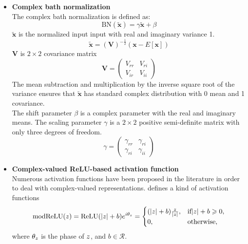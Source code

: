 \documentclass[11pt]{report}
\begin{document}
    \begin{itemize}
    	\item \textbf{Complex bath normalization}\\
    	 The complex bath normalization is defined as:
    	 \begin{equation}
    	 \text{BN}\left(\widetilde{\mathbf{x}}\right) = \gamma \widetilde{\mathbf{x}} + \beta
    	 \end{equation}
    	 $\widetilde{\mathbf{x}}$ is the normalized input input with real and imaginary variance 1. 
    	 \begin{equation}
    	 \widetilde{\mathbf{x}} = \left(\mathbf{V}\right)^{-\frac{1}{2}}\left(\mathbf{x}-E[\mathbf{x}]\right)
    	 \end{equation}
    	 $\mathbf{V}$ is $2 \times 2$ covariance matrix\\
    	 \begin{equation}
    	 \mathbf{V} = \begin{pmatrix}
    	 V_{rr} &V_{ri} \\
    	 V_{ir} &V_{ii}
    	 \end{pmatrix}
    	 \end{equation}
    	 The mean subtraction and multiplication by the inverse square root of the variance ensures that $\widetilde{\mathbf{x}}$ has standard complex distribution with 0 mean and 1 covariance.\\
    	 The shift parameter $\beta$ is a complex parameter with the real and imaginary means. The scaling parameter $\gamma$ is a $2 \times 2$ positive semi-definite matrix with only three degrees of freedom.
    	 \begin{equation}
    	 \gamma = \begin{pmatrix}
    	 \gamma _{rr} &\gamma _{ri} \\
    	 \gamma _{ri} &\gamma _{ii}
    	 \end{pmatrix}
    	 \end{equation}
    	 
    \end{itemize}
    
    \begin{itemize}
    	\item \textbf{Complex-valued ReLU-based activation function}\\
    	Numerous activation functions have been proposed in the literature in order to deal with complex-valued representations. \cite{DBLP:journals/corr/ArjovskySB15} defines a kind of activation functions
    	\begin{equation}
    	\text{modReLU}(\mathnormal{z}) = \text{ReLU}(|\mathnormal{z}|+b)e^{i\theta_\mathnormal{z}} = \begin{cases}
    	(|\mathnormal{z}|+b)\frac{\mathnormal{z}}{|\mathnormal{z}|}, & \text{if} |\mathnormal{z}| + b \geqslant 0,\\
    	0, &\text{otherwise},
    	\end{cases}
    	\end{equation}
    	where $\theta_\mathnormal{z}$ is the phase of $\mathnormal{z}$, and $b\in \mathcal{R}$.
    \end{itemize}
    
\end{document}
